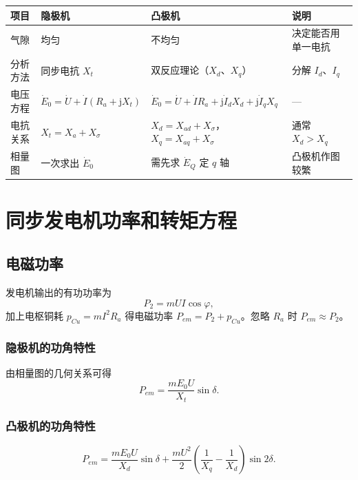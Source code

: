 \begin{center}
\begin{tabular}{@{}p{2.2cm}p{3.4cm}p{3.6cm}p{3.2cm}@{}}
\toprule
项目 & 隐极机 & 凸极机 & 说明 \\
\midrule
气隙 & 均匀 & 不均匀 & 决定能否用单一电抗 \\
分析方法 & 同步电抗 $X_t$ & 双反应理论（$X_d$、$X_q$） & 分解 $I_d$、$I_q$ \\
电压方程 & $\dot E_0=\dot U+\dot I(R_a+\mathrm{j}X_t)$ & $\dot E_0=\dot U+\dot IR_a+\mathrm{j}\dot I_dX_d+\mathrm{j}\dot I_qX_q$ & — \\
电抗关系 & $X_t=X_a+X_\sigma$ & $X_d=X_{ad}+X_\sigma$，$X_q=X_{aq}+X_\sigma$ & 通常 $X_d>X_q$ \\
相量图 & 一次求出 $\dot E_0$ & 需先求 $\dot E_Q$ 定 $q$ 轴 & 凸极机作图较繁 \\
\bottomrule
\end{tabular}
\end{center}


\section{同步发电机功率和转矩方程}

\subsection{电磁功率}
发电机输出的有功功率为
\begin{equation}
P_2=mUI\cos\varphi ,
\end{equation}
加上电枢铜耗 $p_{Cu}=mI^2R_a$ 得电磁功率 $P_{em}=P_2+p_{Cu}$。忽略 $R_a$ 时 $P_{em}\approx P_2$。

\subsubsection{隐极机的功角特性}
由相量图的几何关系可得
\begin{equation}
P_{em}=\frac{mE_0U}{X_t}\sin\delta .
\end{equation}


\subsubsection{凸极机的功角特性}
\begin{equation}
P_{em}=\frac{mE_0U}{X_d}\sin\delta+\frac{mU^{2}}{2}\left(\frac{1}{X_q}-\frac{1}{X_d}\right)\sin2\delta .
\end{equation}

